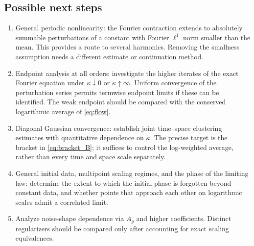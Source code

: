 \documentclass[11pt]{article}
\numberwithin{equation}{section}
\theoremstyle{definition}
\theoremstyle{remark}
\begin{document}
\subsection{Possible next steps}
\begin{enumerate}
 \item General periodic nonlinearity: the Fourier contraction extends to absolutely summable perturbations of a constant with Fourier $\ell^1$ norm smaller than the mean. This provides a route to several harmonics. Removing the smallness assumption needs a different estimate or continuation method.
 \item Endpoint analysis at all orders: investigate the higher iterates of the exact Fourier equation under $\kappa\downarrow0$ or $\kappa\uparrow\infty$. Uniform convergence of the perturbation series permits termwise endpoint limits if these can be identified. The weak endpoint should be compared with the conserved logarithmic average of \eqref{eq:flow}.
 \item Diagonal Gaussian convergence: establish joint time--space clustering estimates with quantitative dependence on $\kappa$. The precise target is the bracket in \eqref{eq:bracket_B}; it suffices to control the log-weighted average, rather than every time and space scale separately.
 \item General initial data, multipoint scaling regimes, and the phase of the limiting law: determine the extent to which the initial phase is forgotten beyond constant data, and whether points that approach each other on logarithmic scales admit a correlated limit.
 \item Analyze noise-shape dependence via $A_g$ and higher coefficients. Distinct regularizers should be compared only after accounting for exact scaling equivalences.
\end{enumerate}
\end{document}
